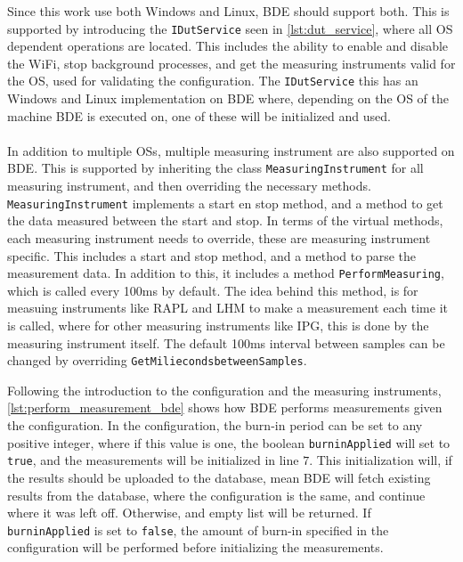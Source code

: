 

Since this work use both Windows and Linux, BDE should support both. This is supported by introducing the \texttt{IDutService} seen in \cref{lst:dut_service}, where all OS dependent operations are located. This includes the ability to enable and disable the WiFi, stop background processes, and get the measuring instruments valid for the OS, used for validating the configuration. The \texttt{IDutService} this has an Windows and Linux implementation on BDE where, depending on the OS of the machine BDE is executed on, one of these will be initialized and used.



\paragraph*{}
In addition to multiple OSs, multiple measuring instrument are also supported on BDE. This is supported by inheriting the class \texttt{MeasuringInstrument} for all measuring instrument, and then overriding the necessary methods. \texttt{MeasuringInstrument} implements a start en stop method, and a method to get the data measured between the start and stop. In terms of the virtual methods, each measuring instrument needs to override, these are measuring instrument specific. This includes a start and stop method, and a method to parse the measurement data. In addition to this, it includes a method \texttt{PerformMeasuring}, which is called every 100ms by default. The idea behind this method, is for measuing instruments like RAPL and LHM to make a measurement each time it is called, where for other measuring instruments like IPG, this is done by the measuring instrument itself. The default 100ms interval between samples can be changed by overriding \texttt{GetMiliecondsbetweenSamples}.



Following the introduction to the configuration and the measuring instruments, \cref{lst:perform_measurement_bde} shows how BDE performs measurements given the configuration. In the configuration, the burn-in period can be set to any positive integer, where if this value is one, the boolean \texttt{burninApplied} will set to \texttt{true}, and the measurements will be initialized in line $7$. This initialization will, if the results should be uploaded to the database, mean BDE will fetch existing results from the database, where the configuration is the same, and continue where it was left off. Otherwise, and empty list will be returned. If \texttt{burninApplied} is set to \texttt{false}, the amount of burn-in specified in the configuration will be performed before initializing the measurements.

